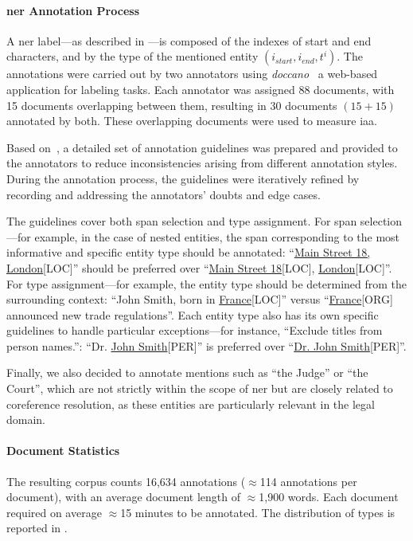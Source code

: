 \paragraph{\ac{ner} Annotation Process}
A \ac{ner} label---as described in ---is composed of the indexes of start and end characters, and by the type of the mentioned entity $(i_{start},i_{end},t^i)$.
The annotations were carried out by two annotators using \textit{doccano}~\cite{doccano} a web-based application for labeling tasks. Each annotator was assigned 88 documents, with 15 documents overlapping between them, resulting in 30 documents $(15 + 15)$ annotated by both. These overlapping documents were used to measure \acl{iaa}.


Based on~\cite{jha2017all}, a detailed set of annotation guidelines was prepared and provided to the annotators to reduce inconsistencies arising from different annotation styles. During the annotation process, the guidelines were iteratively refined by recording and addressing the annotators' doubts and edge cases.

The guidelines cover both span selection and type assignment.  
For span selection---for example, in the case of nested entities, the span corresponding to the most informative and specific entity type should be annotated: ``\underline{Main Street 18, London}[LOC]'' should be preferred over ``\underline{Main Street 18}[LOC], \underline{London}[LOC]''.
For type assignment---for example, the entity type should be determined from the surrounding context: ``John Smith, born in \underline{France}[LOC]'' versus ``\underline{France}[ORG] announced new trade regulations''.  
Each entity type also has its own specific guidelines to handle particular exceptions---for instance, ``Exclude titles from person names.'': ``Dr. \underline{John Smith}[PER]'' is preferred over ``\underline{Dr. John Smith}[PER]''.  

Finally, we also decided to annotate mentions such as ``the Judge'' or ``the Court'', which are not strictly within the scope of \ac{ner} but are closely related to coreference resolution, as these entities are particularly relevant in the legal domain.




\paragraph{Document Statistics}
The resulting corpus counts 16,634 annotations ($\approx$114 annotations per document), with an average document length of $\approx$1,900 words. Each document required on average $\approx$15 minutes to be annotated. The distribution of types is reported in .

